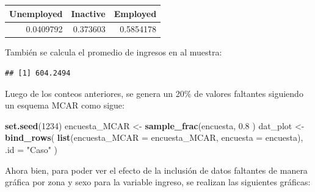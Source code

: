 \documentclass[
  12pt,
]{book}
\newenvironment{Shaded}{\begin{snugshade}}{\end{snugshade}}
\newcommand{\AttributeTok}[1]{\textcolor[rgb]{0.13,0.29,0.53}{#1}}
\newcommand{\ConstantTok}[1]{\textcolor[rgb]{0.56,0.35,0.01}{#1}}
\newcommand{\DecValTok}[1]{\textcolor[rgb]{0.00,0.00,0.81}{#1}}
\newcommand{\FloatTok}[1]{\textcolor[rgb]{0.00,0.00,0.81}{#1}}
\newcommand{\FunctionTok}[1]{\textcolor[rgb]{0.13,0.29,0.53}{\textbf{#1}}}
\newcommand{\NormalTok}[1]{#1}
\newcommand{\OtherTok}[1]{\textcolor[rgb]{0.56,0.35,0.01}{#1}}
\newcommand{\SpecialCharTok}[1]{\textcolor[rgb]{0.81,0.36,0.00}{\textbf{#1}}}
\newcommand{\StringTok}[1]{\textcolor[rgb]{0.31,0.60,0.02}{#1}}
\begin{document}
\begin{tabular}{r|r|r}
\hline
Unemployed & Inactive & Employed\\
\hline
0.0409792 & 0.373603 & 0.5854178\\
\hline
\end{tabular}

También se calcula el promedio de ingresos en al muestra:

\begin{Shaded}
\end{Shaded}

\begin{verbatim}
## [1] 604.2494
\end{verbatim}

Luego de los conteos anteriores, se genera un 20\% de valores faltantes siguiendo un esquema MCAR como sigue:

\begin{Shaded}
\begin{Highlighting}[]
\FunctionTok{set.seed}\NormalTok{(}\DecValTok{1234}\NormalTok{)}
\NormalTok{encuesta\_MCAR }\OtherTok{\textless{}{-}}  \FunctionTok{sample\_frac}\NormalTok{(encuesta, }\FloatTok{0.8}\NormalTok{ )}
\NormalTok{dat\_plot }\OtherTok{\textless{}{-}}       \FunctionTok{bind\_rows}\NormalTok{(}
  \FunctionTok{list}\NormalTok{(}\AttributeTok{encuesta\_MCAR =}\NormalTok{ encuesta\_MCAR, }
       \AttributeTok{encuesta =}\NormalTok{ encuesta), }\AttributeTok{.id =} \StringTok{"Caso"}\NormalTok{  )}
\end{Highlighting}
\end{Shaded}

Ahora bien, para poder ver el efecto de la inclusión de datos faltantes de manera gráfica por zona y sexo para la variable ingreso, se realizan las siguientes gráficas:
\end{document}
